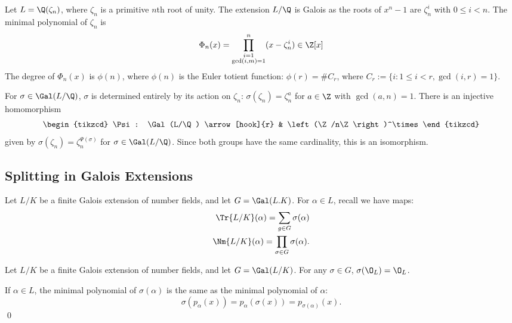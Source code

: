 \begin{ex}
Let $L=\Q(\zeta_n)$, where $\zeta_n$ is a primitive $n$th root of unity. The extension $L/\Q$ is Galois as the roots of $x^n-1$ are $\zeta^i_n$ with $0 \leq i <n$. The minimal polynomial of $\zeta_n$ is
	\[
	\Phi_n(x)= \prod_{\substack{i=1 \\ \gcd(i,m)=1}}^n (x-\zeta_n^i) \in \Z[x]
	\]
The degree of $\Phi_n(x)$ is $\phi(n)$, where $\phi(n)$ is the Euler totient function: $\phi(r)=\#C_r$, where $C_r:=\{i \colon 1 \leq i < r, \gcd(i,r)=1\}$.  

For $\sigma \in \Gal(L/\Q)$, $\sigma$ is determined entirely by its action on $\zeta_n$: $\sigma(\zeta_n)=\zeta_n^a$ for $a \in \Z$ with $\gcd(a,n)=1$. There is an injective homomorphism
	\[
	\begin{tikzcd}
	\Psi: \Gal(L/\Q) \arrow[hook]{r} & \left(\Z/n\Z\right)^\times
	\end{tikzcd} 
	\]
given by $\sigma(\zeta_n)= \zeta_n^{\Psi(\sigma)}$ for $\sigma \in \Gal(L/\Q)$. Since both groups have the same cardinality, this is an isomorphism. \xqed
\end{ex}




\subsection{Splitting in Galois Extensions}


Let $L/K$ be a finite Galois extension of number fields, and let $G=\Gal(L.K)$.  For $\alpha \in L$, recall we have maps:
	\[
	\begin{split}
	\Tr{L/K}(\alpha)= \sum_{g \in G} \sigma(\alpha) \\
	\Nm{L/K}(\alpha)= \prod_{\sigma \in G} \sigma(\alpha).
	\end{split}
	\]

\begin{prop}
Let $L/K$ be a finite Galois extension of number fields, and let $G=\Gal(L/K)$. For any $\sigma \in G$, $\sigma(\O_L)=\O_L$.
\end{prop}

\pf If $\alpha \in L$, the minimal polynomial of $\sigma(\alpha)$ is the same as the minimal polynomial of $\alpha$:
	\[
	\sigma(p_\alpha(x))=p_\alpha(\sigma(x))=p_{\sigma(\alpha)}(x).
	\]
\qed \\


